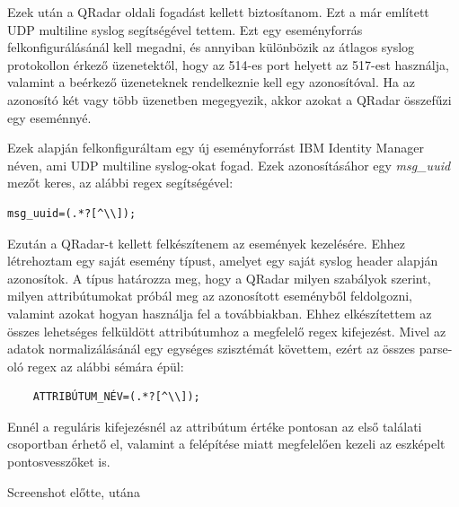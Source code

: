 Ezek után a QRadar oldali fogadást kellett biztosítanom. Ezt a már említett UDP multiline syslog segítségével tettem. Ezt egy eseményforrás felkonfigurálásánál kell megadni, és annyiban különbözik az átlagos syslog protokollon érkező üzenetektől, hogy az 514-es port helyett az 517-est használja, valamint a beérkező üzeneteknek rendelkeznie kell egy azonosítóval. Ha az azonosító két vagy több üzenetben megegyezik, akkor azokat a QRadar összefűzi egy eseménnyé.

Ezek alapján felkonfiguráltam egy új eseményforrást IBM Identity Manager néven, ami UDP multiline syslog-okat fogad. Ezek azonosításáhor egy \textit{msg\_uuid} mezőt keres, az alábbi regex segítségével: 

\begin{lstlisting}
msg_uuid=(.*?[^\\]);
\end{lstlisting}

Ezután a QRadar-t kellett felkészítenem az események kezelésére. Ehhez létrehoztam egy saját esemény típust, amelyet egy saját syslog header alapján azonosítok. A típus határozza meg, hogy a QRadar milyen szabályok szerint, milyen attribútumokat próbál meg az azonosított eseményből feldolgozni, valamint azokat hogyan használja fel a továbbiakban. Ehhez elkészítettem az összes lehetséges felküldött attribútumhoz a megfelelő regex kifejezést. Mivel az adatok normalizálásánál egy egységes szisztémát követtem, ezért az összes parse-oló regex az alábbi sémára épül:

\begin{lstlisting}
	ATTRIBÚTUM_NÉV=(.*?[^\\]);
\end{lstlisting}

Ennél a reguláris kifejezésnél az attribútum értéke pontosan az első találati csoportban érhető el, valamint a felépítése miatt megfelelően kezeli az \todo eszképelt pontosvesszőket is.

\todo Screenshot előtte, utána\\

